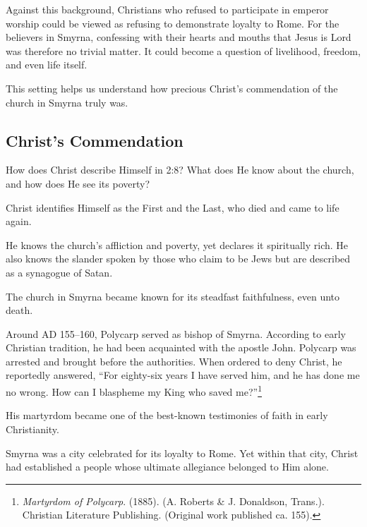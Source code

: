 Against this background, Christians who refused to participate in emperor worship could be viewed as refusing to demonstrate loyalty to Rome. For the believers in Smyrna, confessing with their hearts and mouths that Jesus is Lord was therefore no trivial matter. It could become a question of livelihood, freedom, and even life itself.

This setting helps us understand how precious Christ's commendation of the church in Smyrna truly was.

\subsection{Christ's Commendation}

\begin{ScriptureBox2}{How does Christ describe Himself in 2:8? What does He know about the church, and how does He see its poverty?}
\item[2:8] Christ identifies Himself as the First and the Last, who died and came to life again.

\item[2:9] He knows the church's affliction and poverty, yet declares it spiritually rich. He also knows the slander spoken by those who claim to be Jews but are described as a synagogue of Satan.
\end{ScriptureBox2}

The church in Smyrna became known for its steadfast faithfulness, even unto death.

Around AD 155--160, Polycarp served as bishop of Smyrna. According to early Christian tradition, he had been acquainted with the apostle John. Polycarp was arrested and brought before the authorities. When ordered to deny Christ, he reportedly answered, ``For eighty-six years I have served him, and he has done me no wrong. How can I blaspheme my King who saved me?''\footnote{\textit{Martyrdom of Polycarp}. (1885). (A. Roberts \& J. Donaldson, Trans.). Christian Literature Publishing. (Original work published ca. 155).}

His martyrdom became one of the best-known testimonies of faith in early Christianity.

Smyrna was a city celebrated for its loyalty to Rome. Yet within that city, Christ had established a people whose ultimate allegiance belonged to Him alone.

